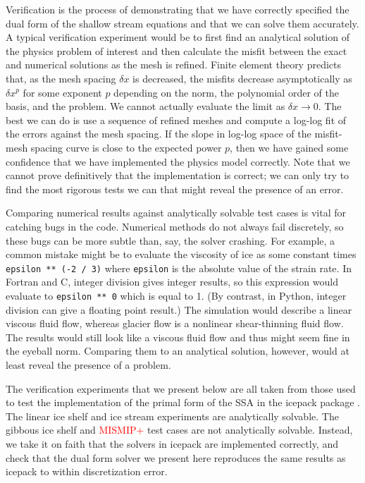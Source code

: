\documentclass{article}
\theoremstyle{definition}
\theoremstyle{plain}
\begin{document}
Verification is the process of demonstrating that we have correctly specified the dual form of the shallow stream equations and that we can solve them accurately.
A typical verification experiment would be to first find an analytical solution of the physics problem of interest and then calculate the misfit between the exact and numerical solutions as the mesh is refined.
Finite element theory predicts that, as the mesh spacing $\delta x$ is decreased, the misfits decrease asymptotically as $\delta x^p$ for some exponent $p$ depending on the norm, the polynomial order of the basis, and the problem.
We cannot actually evaluate the limit as $\delta x \to 0$.
The best we can do is use a sequence of refined meshes and compute a log-log fit of the errors against the mesh spacing.
If the slope in log-log space of the misfit-mesh spacing curve is close to the expected power $p$, then we have gained some confidence that we have implemented the physics model correctly.
Note that we cannot prove definitively that the implementation is correct; we can only try to find the most rigorous tests we can that might reveal the presence of an error.

Comparing numerical results against analytically solvable test cases is vital for catching bugs in the code.
Numerical methods do not always fail discretely, so these bugs can be more subtle than, say, the solver crashing.
For example, a common mistake might be to evaluate the viscosity of ice as some constant times \texttt{epsilon ** (-2 / 3)} where \texttt{epsilon} is the absolute value of the strain rate.
In Fortran and C, integer division gives integer results, so this expression would evaluate to \texttt{epsilon ** 0} which is equal to 1.
(By contrast, in Python, integer division can give a floating point result.)
The simulation would describe a linear viscous fluid flow, whereas glacier flow is a nonlinear shear-thinning fluid flow.
The results would still look like a viscous fluid flow and thus might seem fine in the eyeball norm.
Comparing them to an analytical solution, however, would at least reveal the presence of a problem.

The verification experiments that we present below are all taken from those used to test the implementation of the primal form of the SSA in the icepack package \citep{shapero2021icepack}.
The linear ice shelf and ice stream experiments are analytically solvable.
The gibbous ice shelf and \textcolor{red}{MISMIP+} test cases are not analytically solvable.
Instead, we take it on faith that the solvers in icepack are implemented correctly, and check that the dual form solver we present here reproduces the same results as icepack to within discretization error.
\end{document}
